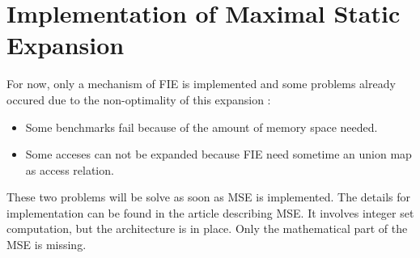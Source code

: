 \chapter{Implementation of Maximal Static Expansion}\label{ch:MSEImp}

For now, only a mechanism of \ac{FIE} is implemented and some problems already occured due to the non-optimality of this expansion :
\begin{itemize}
\item Some benchmarks fail because of the amount of memory space needed.
\item Some acceses can not be expanded because \ac{FIE} need sometime an union map as access relation.
\end{itemize}

These two problems will be solve as soon as \ac{MSE} is implemented. The details for implementation can be found in the article describing \ac{MSE}\cite{MSE}. It involves integer set computation, but the architecture is in place. Only the mathematical part of the \ac{MSE} is missing.